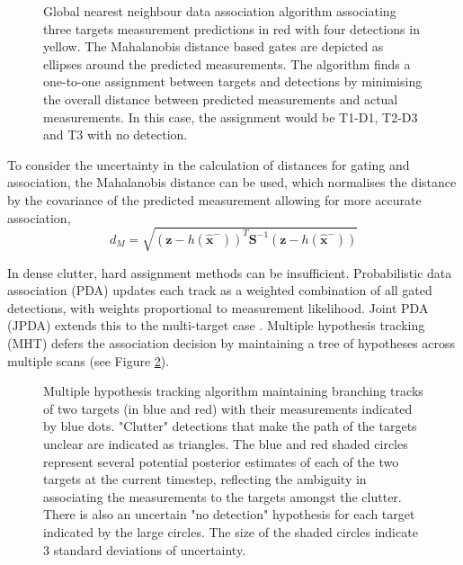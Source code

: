 \begin{figure}[htb]
    \label{fig:gnn}
    \caption[Global nearest neighbour data association.]{Global nearest neighbour 
    data association algorithm associating three targets measurement predictions 
    in red with four detections in yellow. The Mahalanobis distance based gates are depicted 
    as ellipses around the predicted measurements. The algorithm finds a one-to-one 
    assignment between targets and detections by minimising the overall distance 
    between predicted measurements and actual measurements. In this case, the assignment
    would be T1-D1, T2-D3 and T3 with no detection.}
\end{figure}

To consider the uncertainty in the calculation of distances for gating and association,
the Mahalanobis distance can be used, which normalises the distance by the covariance
of the predicted measurement allowing for more accurate association,
\begin{equation}
    d_M = \sqrt{(\mathbf{z} - h(\hat{\mathbf{x}}^-))^T \mathbf{S}^{-1} (\mathbf{z} - h(\hat{\mathbf{x}}^-))}
\end{equation}

In dense clutter, hard assignment methods can be insufficient. Probabilistic data 
association (PDA) updates each track as a weighted combination of all gated detections, 
with weights proportional to measurement likelihood. Joint PDA (JPDA) extends this to 
the multi-target case \cite{barshalom1988tracking}. Multiple hypothesis tracking (MHT) 
defers the association decision by maintaining a tree of hypotheses across multiple 
scans \cite{reid1979mht} (see Figure \ref{fig:mht}).

\begin{figure}[htb]
    \label{fig:mht}
    \caption[Multiple hypothesis tracking with two targets in clutter.]{Multiple hypothesis tracking algorithm maintaining branching tracks
    of two targets (in blue and red) with their measurements indicated by blue
    dots.
    "Clutter" detections that make the path of the targets unclear are indicated
    as triangles. The blue and red shaded circles represent several potential
    posterior estimates of each of the two targets at the current timestep,
    reflecting the ambiguity in associating the measurements to the targets
    amongst the clutter. There is also an uncertain "no detection" hypothesis
    for each target indicated by the large circles. The size of the shaded circles 
    indicate 3 standard deviations of uncertainty.}
\end{figure}


